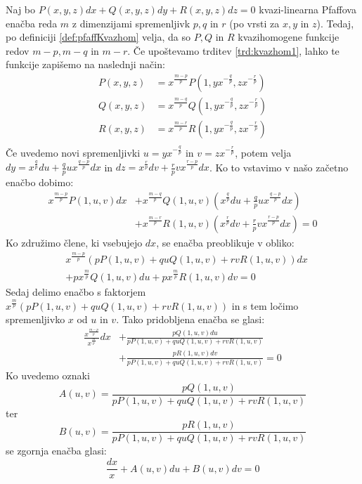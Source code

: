 \documentclass[a4paper, 10pt]{article}
\begin{document}
						Naj bo $P(x, y, z)dx + Q(x, y, z)dy + R(x, y, z)dz = 0$ kvazi-linearna Pfaffova enačba  reda $m$ z dimenzijami spremenljivk $p, q$ in $r$ (po vrsti za $x, y$ in $z$). Tedaj, po definiciji \ref{def:pfaffKvazhom} velja, da so $P, Q$ in $R$ kvazihomogene funkcije redov $m-p, m-q$ in $m-r$. Če upoštevamo trditev \ref{trd:kvazhom1}, lahko te funkcije zapišemo na naslednji način: \begin{align*}
							P(x, y, z) &= x^{\frac{m-p}{p}}P(1, yx^{-\frac{q}{p}}, zx^{-\frac{r}{p}}) \\
							Q(x, y, z) &= x^{\frac{m-q}{p}}Q(1, yx^{-\frac{q}{p}}, zx^{-\frac{r}{p}}) \\
							R(x, y, z) &= x^{\frac{m-r}{p}}R(1, yx^{-\frac{q}{p}}, zx^{-\frac{r}{p}}) \\
						\end{align*}
						Če uvedemo novi spremenljivki $u = yx^{-\frac{q}{p}}$ in $v = zx^{-\frac{r}{p}}$, potem velja $dy = x^{\frac{q}{p}}du + \frac{q}{p}ux^{\frac{q-p}{p}}dx$ in $dz = x^{\frac{r}{p}}dv + \frac{r}{p}vx^{\frac{r-p}{p}}dx$. Ko to vstavimo v našo začetno enačbo dobimo: \begin{align*}
							x^{\frac{m-p}{p}}P(1, u, v) dx &+ x^{\frac{m-q}{p}}Q(1, u, v)(x^{\frac{q}{p}}du + \frac{q}{p}ux^{\frac{q-p}{p}}dx) \\ 
							&+ x^{\frac{m-r}{p}}R(1, u, v) (x^{\frac{r}{p}}dv + \frac{r}{p}vx^{\frac{r-p}{p}}dx) = 0
						\end{align*}
						Ko združimo člene, ki vsebujejo $dx$, se enačba preoblikuje v obliko: \begin{align*}
						&x^{\frac{m-p}{p}}(pP(1, u, v) + quQ(1, u, v) + rvR(1, u, v))dx \\ &+ px^{\frac{m}{p}}Q(1, u, v)du + px^{\frac{m}{p}}R(1, u, v)dv  = 0 
						\end{align*}
						Sedaj delimo enačbo s faktorjem $x^{\frac{m}{p}}(pP(1, u, v) + quQ(1, u, v) + rvR(1, u, v))$ in s tem ločimo spremenljivko $x$ od $u$ in $v$. Tako pridobljena enačba se glasi: \begin{align*}
							\frac{x^{\frac{m-p}{p}}}{x^{\frac{m}{p}}}dx &+ \frac{pQ(1, u, v)du}{pP(1, u, v) + quQ(1, u, v) + rvR(1, u, v)} \\ 
							&+ \frac{pR(1, u, v)dv}{pP(1, u, v) + quQ(1, u, v) + rvR(1, u, v)} = 0
						\end{align*}
						Ko uvedemo oznaki $$A(u, v) = \frac{pQ(1, u, v)}{pP(1, u, v) + quQ(1, u, v) + rvR(1, u, v)}$$ ter $$B(u, v) = \frac{pR(1, u, v)}{pP(1, u, v) + quQ(1, u, v) + rvR(1, u, v)}$$ se zgornja enačba glasi: $$ \frac{dx}{x} + A(u, v)du + B(u, v)dv = 0$$
						
\end{document}
